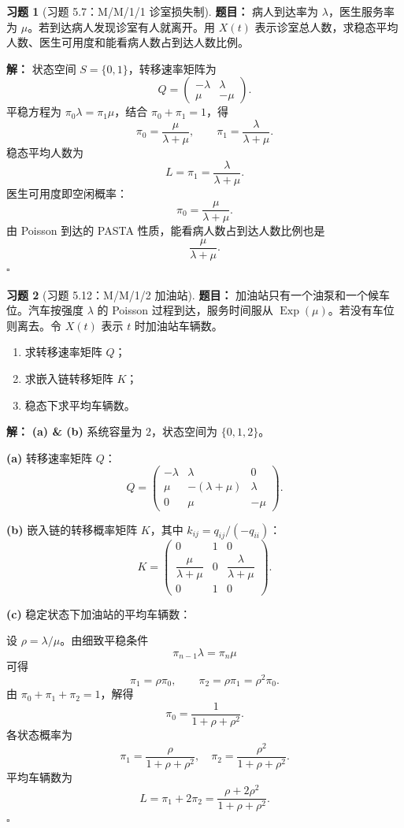 \documentclass[12pt,a4paper,openany]{ctexrep}
\theoremstyle{definition}
\newtheorem{exercise}{习题}[section]
\newenvironment{solution}{\par\noindent\textbf{解：}}{\hfill$\square$\par}
\newcommand{\Exp}{\operatorname{Exp}}
\begin{document}
\begin{exercise}[习题 5.7：M/M/1/1 诊室损失制]
\textbf{题目：}
病人到达率为 $\lambda$，医生服务率为 $\mu$。若到达病人发现诊室有人就离开。用 $X(t)$ 表示诊室总人数，求稳态平均人数、医生可用度和能看病人数占到达人数比例。
\end{exercise}
\begin{solution}
状态空间 $S=\{0,1\}$，转移速率矩阵为
\[
Q=
\begin{pmatrix}
-\lambda&\lambda\\
\mu&-\mu
\end{pmatrix}.
\]
平稳方程为 $\pi_0\lambda=\pi_1\mu$，结合 $\pi_0+\pi_1=1$，得
\[
\pi_0=\frac{\mu}{\lambda+\mu},\qquad
\pi_1=\frac{\lambda}{\lambda+\mu}.
\]
稳态平均人数为
\[
L=\pi_1=\frac{\lambda}{\lambda+\mu}.
\]
医生可用度即空闲概率：
\[
\pi_0=\frac{\mu}{\lambda+\mu}.
\]
由 Poisson 到达的 PASTA 性质，能看病人数占到达人数比例也是
\[
\frac{\mu}{\lambda+\mu}.
\]
\end{solution}

\begin{exercise}[习题 5.12：M/M/1/2 加油站]
\textbf{题目：}
加油站只有一个油泵和一个候车位。汽车按强度 $\lambda$ 的 Poisson 过程到达，服务时间服从 $\Exp(\mu)$。若没有车位则离去。令 $X(t)$ 表示 $t$ 时加油站车辆数。
\begin{enumerate}[label=(\alph*)]
	\item 求转移速率矩阵 $Q$；
	\item 求嵌入链转移矩阵 $K$；
	\item 稳态下求平均车辆数。
\end{enumerate}
\end{exercise}
\begin{solution}
\textbf{(a) \& (b)} 系统容量为 $2$，状态空间为 $\{0,1,2\}$。

\textbf{(a)} 转移速率矩阵 $Q$：
\[
Q=
\begin{pmatrix}
-\lambda&\lambda&0\\
\mu&-(\lambda+\mu)&\lambda\\
0&\mu&-\mu
\end{pmatrix}.
\]

\textbf{(b)} 嵌入链的转移概率矩阵 $K$，其中 $k_{ij}=q_{ij}/(-q_{ii})$：
\[
K=
\begin{pmatrix}
0&1&0\\
\dfrac{\mu}{\lambda+\mu}&0&\dfrac{\lambda}{\lambda+\mu}\\
0&1&0
\end{pmatrix}.
\]

\textbf{(c)} 稳定状态下加油站的平均车辆数：

设 $\rho=\lambda/\mu$。由细致平稳条件
\[
\pi_{n-1}\lambda=\pi_n\mu
\]
可得
\[
\pi_1=\rho\pi_0,\qquad \pi_2=\rho\pi_1=\rho^2\pi_0.
\]
由 $\pi_0+\pi_1+\pi_2=1$，解得
\[
\pi_0=\frac1{1+\rho+\rho^2}.
\]
各状态概率为
\[
\pi_1=\frac{\rho}{1+\rho+\rho^2},\quad
\pi_2=\frac{\rho^2}{1+\rho+\rho^2}.
\]
平均车辆数为
\[
L=\pi_1+2\pi_2=\frac{\rho+2\rho^2}{1+\rho+\rho^2}.
\]
\end{solution}
\end{document}
